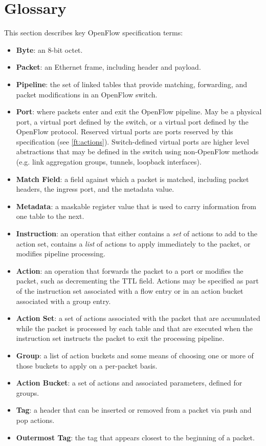 \documentclass[10pt]{article}
\begin{document}
\section{Glossary}
\label{sec:glossary}
This section describes key OpenFlow specification terms:
\begin{itemize}
\item \textbf{Byte}: an 8-bit octet.
\item \textbf{Packet}: an Ethernet frame, including header and payload.
\item \textbf{Pipeline}: the set of linked tables that provide matching, forwarding, and packet modifications in an OpenFlow switch.
\item \textbf{Port}: where packets enter and exit the OpenFlow pipeline. May be a physical port, a virtual port defined by the switch, or a virtual port defined by the OpenFlow protocol. Reserved virtual ports are ports reserved by this specification (see \ref{ft:actions}). Switch-defined virtual ports are higher level abstractions that may be defined in the switch using non-OpenFlow methods (e.g. link aggregation groups, tunnels, loopback interfaces).
\item \textbf{Match Field}: a field against which a packet is matched, including packet headers, the ingress port, and the metadata value.
\item \textbf{Metadata}: a maskable register value that is used to carry information from one table to the next.
\item \textbf{Instruction}: an operation that either contains a \emph{set} of actions to add to the action set, contains a \emph{list} of actions to apply immediately to the packet, or modifies pipeline processing.
\item \textbf{Action}: an operation that forwards the packet to a port or modifies the packet, such as decrementing the TTL field. Actions may be specified as part of the instruction set associated with a flow entry or in an action bucket associated with a group entry.
\item \textbf{Action Set}: a set of actions associated with the packet that are accumulated while the packet is processed by each table and that are executed when the instruction set instructs the packet to exit the processing pipeline.
\item \textbf{Group}: a list of action buckets and some means of choosing one or more of those buckets to apply on a per-packet basis.
\item \textbf{Action Bucket}: a set of actions and associated parameters, defined for groups.
\item \textbf{Tag}: a header that can be inserted or removed from a packet via push and pop actions.
\item \textbf{Outermost Tag}: the tag that appears closest to the beginning of a packet.
\end{itemize}
\end{document}
